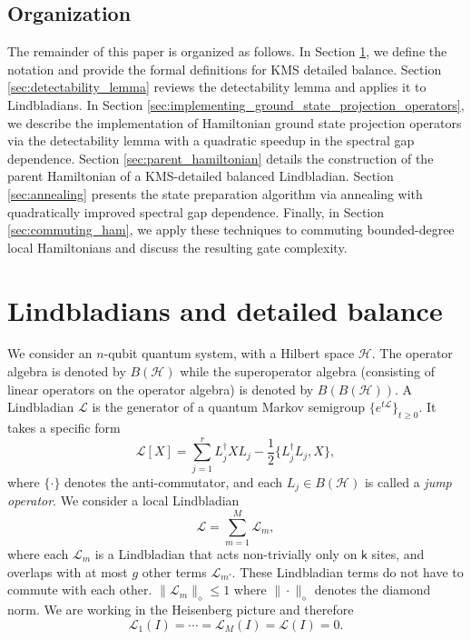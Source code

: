 \documentclass{article}
\theoremstyle{plain}
\theoremstyle{plain}
\theoremstyle{plain}
\theoremstyle{plain}
\theoremstyle{plain}
\theoremstyle{plain}
\theoremstyle{plain}
\begin{document}
\subsection{Organization}
The remainder of this paper is organized as follows. In Section \ref{sec:problem_setup}, we define the notation and provide the formal definitions for KMS detailed balance. Section \ref{sec:detectability_lemma} reviews the detectability lemma and applies it to Lindbladians. In Section \ref{sec:implementing_ground_state_projection_operators}, we describe the implementation of Hamiltonian ground state projection operators via the detectability lemma with a quadratic speedup in the spectral gap dependence. Section \ref{sec:parent_hamiltonian} details the construction of the parent Hamiltonian of a KMS-detailed balanced Lindbladian. Section \ref{sec:annealing} presents the state preparation algorithm via annealing with quadratically improved spectral gap dependence. Finally, in Section \ref{sec:commuting_ham}, we apply these techniques to commuting bounded-degree local Hamiltonians and discuss the resulting gate complexity.


\section{Lindbladians and detailed balance}
\label{sec:problem_setup}

We consider an $n$-qubit quantum system, with a Hilbert space $\mathcal{H}$. The operator algebra is denoted by $B(\mathcal{H})$ while the superoperator algebra (consisting of linear operators on the operator algebra) is denoted by $B(B(\mathcal{H}))$.
A Lindbladian $\mathcal{L}$ is the generator of a quantum Markov semigroup $\{e^{t\mathcal{L}}\}_{t\geq 0}$. It takes a specific form
\[
\mathcal{L}[X] = \sum_{j=1}^r L_j^\dag X L_j - \frac{1}{2}\{L_j^\dag L_j,X\},
\]
where $\{\cdot\}$ denotes the anti-commutator, and each $L_j\in B(\mathcal{H})$ is called a \emph{jump operator}. 
We consider a local Lindbladian
\begin{equation}
    \label{eq:Lindbladian}
    \mathcal{L} = \sum_{m=1}^M \mathcal{L}_m,
\end{equation}
where each $\mathcal{L}_m$ is a Lindbladian that acts non-trivially only on $\mathsf{k}$ sites, and overlaps with at most $g$ other terms $\mathcal{L}_{m'}$. These Lindbladian terms do not have to commute with each other.
$\|\mathcal{L}_m\|_\diamond\leq 1$ where $\|\cdot\|_\diamond$ denotes the diamond norm.
We are working in the Heisenberg picture and therefore
\begin{equation}
\label{eq:trace_preserving}
    \mathcal{L}_1(I)=\cdots=\mathcal{L}_M(I)=\mathcal{L}(I)=0.
\end{equation}
\end{document}
